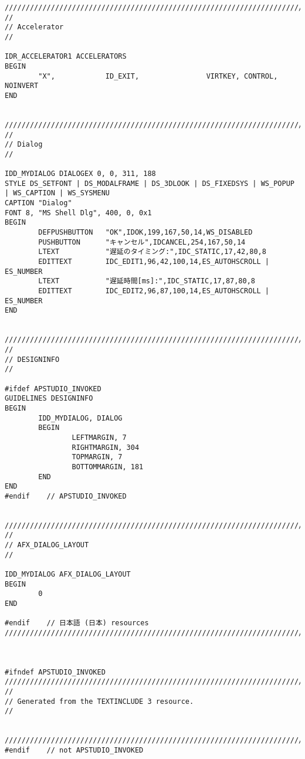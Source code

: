 \begin{lstlisting}[caption=resource.rc]
/////////////////////////////////////////////////////////////////////////////
//
// Accelerator
//

IDR_ACCELERATOR1 ACCELERATORS
BEGIN
		"X",            ID_EXIT,                VIRTKEY, CONTROL, NOINVERT
END


/////////////////////////////////////////////////////////////////////////////
//
// Dialog
//

IDD_MYDIALOG DIALOGEX 0, 0, 311, 188
STYLE DS_SETFONT | DS_MODALFRAME | DS_3DLOOK | DS_FIXEDSYS | WS_POPUP | WS_CAPTION | WS_SYSMENU
CAPTION "Dialog"
FONT 8, "MS Shell Dlg", 400, 0, 0x1
BEGIN
		DEFPUSHBUTTON   "OK",IDOK,199,167,50,14,WS_DISABLED
		PUSHBUTTON      "キャンセル",IDCANCEL,254,167,50,14
		LTEXT           "遅延のタイミング:",IDC_STATIC,17,42,80,8
		EDITTEXT        IDC_EDIT1,96,42,100,14,ES_AUTOHSCROLL | ES_NUMBER
		LTEXT           "遅延時間[ms]:",IDC_STATIC,17,87,80,8
		EDITTEXT        IDC_EDIT2,96,87,100,14,ES_AUTOHSCROLL | ES_NUMBER
END


/////////////////////////////////////////////////////////////////////////////
//
// DESIGNINFO
//

#ifdef APSTUDIO_INVOKED
GUIDELINES DESIGNINFO
BEGIN
		IDD_MYDIALOG, DIALOG
		BEGIN
				LEFTMARGIN, 7
				RIGHTMARGIN, 304
				TOPMARGIN, 7
				BOTTOMMARGIN, 181
		END
END
#endif    // APSTUDIO_INVOKED


/////////////////////////////////////////////////////////////////////////////
//
// AFX_DIALOG_LAYOUT
//

IDD_MYDIALOG AFX_DIALOG_LAYOUT
BEGIN
		0
END

#endif    // 日本語 (日本) resources
/////////////////////////////////////////////////////////////////////////////



#ifndef APSTUDIO_INVOKED
/////////////////////////////////////////////////////////////////////////////
//
// Generated from the TEXTINCLUDE 3 resource.
//


/////////////////////////////////////////////////////////////////////////////
#endif    // not APSTUDIO_INVOKED
	
\end{lstlisting}
